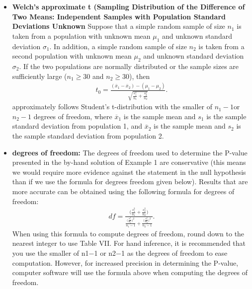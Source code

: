 \documentclass{report}
\begin{document}
\begin{itemize}
            \bigbreak \noindent 
        \item \textbf{Welch's approximate t (Sampling Distribution of the Difference of Two Means: Independent Samples with Population Standard Deviations Unknown }
            Suppose that a simple random sample of size $n_1$ is taken from a population with unknown mean $\mu_1$ and unknown standard deviation $\sigma_1$. In addition, a simple random sample of size $n_2$ is taken from a second population with unknown mean $\mu_2$ and unknown standard deviation $\sigma_2$. If the two populations are normally distributed or the sample sizes are sufficiently large ($n_1 \geq 30$ and $n_2 \geq 30$), then
            \begin{align*}
                t_{0} = \frac{(\overline{x}_{1} - \overline{x}_{2}) - (\mu_{1} - \mu_{2})}{\sqrt{\frac{s_{1}^{2}}{n_{1}} + \frac{s_{2}^{2}}{n_{2}}}}
            .\end{align*}
        approximately  follows Student's t-distribution with the smaller of  $n_{1} -1 $or  $n_{2}-1 $ degrees of freedom, where $\overline{x}_{1} $ is the sample mean and $s_{1} $ is the sample standard deviation from population 1, and $\overline{x}_{2} $ is the sample mean and $s_{2}$ is the sample standard deviation from population 2.
        \item \textbf{degrees of freedom:}
            The degrees of freedom used to determine the P-value presented in the by-hand solution of Example 1 are conservative (this means we would require more evidence against the statement in the null hypothesis than if we use the formula for degrees freedom given below).
            \bigbreak \noindent 
            Results that are more accurate can be obtained using the following formula for degrees of freedom:
            \bigbreak \noindent 
            \begin{align*}
                df = \frac{\bigg(\frac{s_{1}^{2}}{n_{1}} + \frac{s_{2}^{2}}{n_{2}}\bigg)}{\frac{\bigg(\frac{s_{1}^{2}}{n_{1}}\bigg)^{2}}{n_{1}-1}+ \frac{\bigg(\frac{s_{2}^{2}}{n_{2}}\bigg)^{2}}{n_{2}-1}}
            .\end{align*}
            \bigbreak \noindent 
            When using this formula to compute degrees of freedom, round down to the nearest integer to use Table VII. For hand inference, it is recommended that you use the smaller of n1−1 or n2−1 as the degrees of freedom to ease computation. However, for increased precision in determining the P-value, computer software will use the formula above when computing the degrees of freedom.

\end{itemize}
\end{document}
